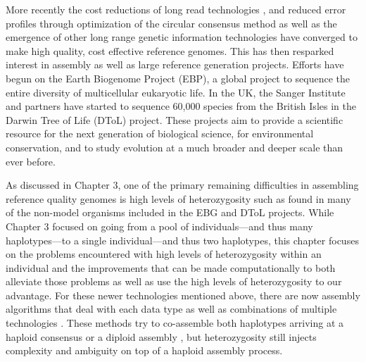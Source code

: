 \par{
More recently the cost reductions of long read technologies \cite{pacbio} \cite{oxford}, and reduced error profiles through optimization of the circular consensus method \cite{ccs}\cite{HIFI}
as well as the emergence of other long range genetic information technologies \cite{10xlinked} \cite{HiC} \cite{bionano} 
have converged to make high quality, cost effective reference genomes. This has then resparked interest in assembly 
as well as large reference generation projects. Efforts have begun on the Earth Biogenome Project (EBP)\cite{EBGP}, a global project to sequence the entire diversity of multicellular eukaryotic life. In the UK, the Sanger Institute and partners have started to sequence 60,000 species from the British Isles in the Darwin Tree of Life (DToL) project. These projects aim to provide a scientific resource for the next generation of biological science, for environmental conservation, and to study evolution at a much broader and deeper scale than ever before. 
}

\par{
As discussed in Chapter 3, one of the primary remaining difficulties in assembling reference quality genomes is high levels of heterozygosity such as found in many of the non-model organisms included in the EBG and DToL projects. While Chapter 3 focused on going from a pool of individuals---and thus many haplotypes---to a single individual---and thus two haplotypes, this chapter focuses on the problems encountered with high levels of heterozygosity within an individual and the improvements that can be made computationally to both alleviate those problems as well as use the high levels of heterozygosity to our advantage. 
For these newer technologies mentioned above, there are now assembly algorithms that deal with each data type \cite{falcon} \cite{supernova} \cite{bionano_assembly} 
as well as combinations of multiple technologies \cite{genemyers} \cite{hybrid10x} \cite{hicscafffirst}\cite{hicassembly}. 
 These methods try to co-assemble both haplotypes arriving at a haploid consensus \cite{watchtower} \cite{canu} 
 or a diploid assembly \cite{falconPHASE} \cite{supernova} \cite{hifiasm}\cite{dipasm}, but heterozygosity still injects complexity and ambiguity on top of a haploid assembly process.
}

